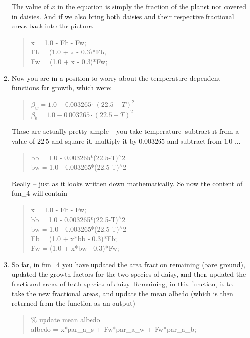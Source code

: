 \documentclass{tufte-book} %
\newenvironment{docspec}{\begin{quotation}\ttfamily\parskip0pt\parindent0pt\ignorespaces}{\end{quotation}}
\begin{document}
\begin{enumerate}
The value of \(x\) in the equation is simply the fraction of the planet not covered in daisies. And if we also bring both daisies and their respective fractional areas back into the picture:
\begin{docspec}
x = 1.0 - Fb - Fw;\\
Fb = (1.0 + x - 0.3)*Fb;\\
Fw = (1.0 + x - 0.3)*Fw;\\
\end{docspec}

\item Now you are in a position to worry about the temperature dependent functions for growth, which were:
\begin{docspec}
\(\beta_{w} = 1.0-0.003265\cdot(22.5-T)^{2}\)
\\\(\beta_{b} = 1.0-0.003265\cdot(22.5-T)^{2}\)
\end{docspec}

These are actually pretty simple -- you take temperature, subtract it from a value of \(22.5\) and square it, multiply it by \(0.003265\) and subtract from \(1.0\) ...
\begin{docspec}
bb = 1.0 - 0.003265*(22.5-T)\(^{\wedge}\)2\\
bw = 1.0 - 0.003265*(22.5-T)\(^{\wedge}\)2
\end{docspec}
Really -- just as it looks written down mathematically. So now the content of \textsf{fun\_4} will contain:
\begin{docspec}
x = 1.0 - Fb - Fw;\\
bb = 1.0 - 0.003265*(22.5-T)\(^{\wedge}\)2\\
bw = 1.0 - 0.003265*(22.5-T)\(^{\wedge}\)2\\
Fb = (1.0 + x*bb - 0.3)*Fb;\\
Fw = (1.0 + x*bw - 0.3)*Fw;
\end{docspec}

\item So far, in \textsf{fun\_4} you have updated the  area fraction remaining (bare ground), updated the growth factors for the two species of daisy, and then updated the fractional areas of both species of daisy. Remaining, in this function, is to take the new fractional areas, and update the mean albedo (which is then returned from the function as an output):
\begin{docspec}
\textcolor[rgb]{0,0.501961,0}{\% update mean albedo\\}
albedo = x*par\_a\_s + Fw*par\_a\_w + Fw*par\_a\_b;
\end{docspec}


\end{enumerate}
\end{document}
